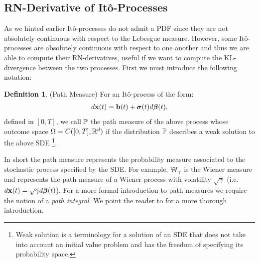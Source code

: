 \documentclass[a4paper,12pt,twoside,openright]{report}
\theoremstyle{definition}
\newtheorem{definition}{Definition}[section]
\begin{document}
\subsection{RN-Derivative of Itô-Processes}


As we hinted earlier Itô-processes do not admit a PDF since they are not absolutely continuous with respect to the Lebesgue measure. However, some Itô-processes are absolutely continuous with respect to one another and thus we are able to compute their RN-derivatives, useful if we want to compute the KL-divergence between the two processes.  First we must introduce the following notation:
\begin{definition} (Path Measure) \label{def:pathmesu}
    For an Itô-process of the form:
    \begin{align*}
        d\rvx(t) = \rvb(t) + \rvsigma(t) d\rvw(t),
    \end{align*}
    defined in $[0,T]$, we call $\P$ the path measure of the above process whose outcome space $\Omega=C([0,T], \R^d)$ if the distribution $\P$ describes a weak solution to the above SDE \footnote{Weak solution is a terminology for a solution of an SDE that does not take into account an initial value problem and has  the freedom of specifying its probability space.}.
\end{definition}

In short the path measure represents the probability measure associated to the stochastic process specified by the SDE.  For example, $\W_{\gamma}$ is the Wiener measure and represents the path measure of a Wiener process with volatility $\sqrt{\gamma}$
 (i.e. $d\rvx(t) = \sqrt{\gamma} d \rvw(t)$). For a more formal introduction to path measures we require the notion of a \textit{path integral}. We point the reader to \cite{sarkka2019applied, oksendal2003stochastic} for a more thorough introduction.
 
\end{document}
